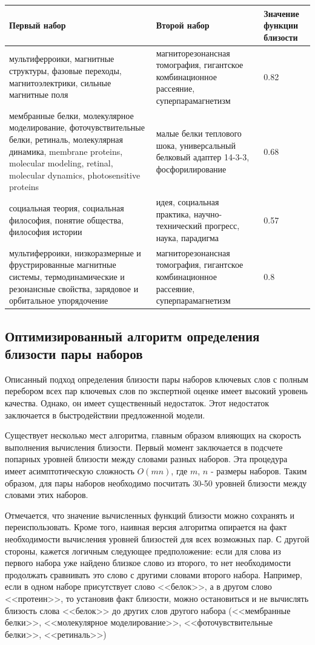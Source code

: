\begin{tabularx}{16cm}{|X|X|X|}
        \hline
        Первый набор & Второй набор & Значение функции близости \\ \hline
        мультиферроики, магнитные структуры, фазовые переходы, магнитоэлектрики, сильные магнитные поля & магниторезонансная томография, гигантское комбинационное рассеяние, суперпарамагнетизм & 0.82 \\ \hline
        мембранные белки, молекулярное моделирование, фоточувствительные белки, ретиналь, молекулярная динамика, membrane proteins, molecular modeling, retinal, molecular dynamics, photosensitive proteins & малые белки теплового шока, универсальный белковый адаптер 14-3-3, фосфорилирование & 0.68 \\ \hline
        социальная теория, социальная философия, понятие общества, философия истории & идея, социальная практика, научно-технический прогресс, наука, парадигма & 0.57 \\ \hline
        мультиферроики, низкоразмерные и фрустрированные магнитные системы, термодинамические и резонансные свойства, зарядовое и орбитальное упорядочение & магниторезонансная томография, гигантское комбинационное рассеяние, суперпарамагнетизм & 0.8 \\ \hline

\end{tabularx}


\subsection{Оптимизированный алгоритм определения близости пары наборов}

Описанный подход определения близости пары наборов ключевых слов с полным перебором всех пар ключевых слов по экспертной оценке имеет высокий уровень качества. Однако, он имеет существенный недостаток. Этот недостаток заключается в быстродействии предложенной модели. 

Существует несколько мест алгоритма, главным образом влияющих на скорость выполнения вычисления близости. Первый момент заключается в подсчете попарных уровней близости между словами разных наборов. Эта процедура имеет асимптотическую сложность $O(mn)$, где $m$, $n$ - размеры наборов. Таким образом, для пары наборов необходимо посчитать 30-50 уровней близости между словами этих наборов.

Отмечается, что значение вычисленных функций близости можно сохранять и переиспользовать. Кроме того, наивная версия алгоритма опирается на факт необходимости вычисления уровней близостей для всех возможных пар. С другой стороны, кажется логичным следующее предположение: если для слова из первого набора уже найдено близкое слово из второго, то нет необходимости продолжать сравнивать это слово с другими словами второго набора. Например, если в одном наборе присутствует слово <<белок>>, а в другом слово <<протеин>>, то установив факт близости, можно остановиться и не вычислять близость слова <<белок>> до других слов другого набора (<<мембранные белки>>, <<молекулярное моделирование>>, <<фоточувствительные белки>>, <<ретиналь>>)

